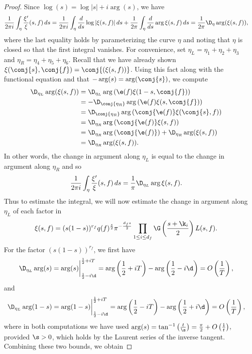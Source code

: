 \begin{proof}
      Since $\log(s) = \log|s|+i\arg(s)$, we have
      \[
        \frac{1}{2\pi i}\int_{\eta}\frac{\xi'}{\xi}(s,f)\,ds = \frac{1}{2\pi i}\int_{\eta}\frac{d}{ds}\log|\xi(s,f)|\,ds+\frac{1}{2\pi }\int_{\eta}\frac{d}{ds}\arg\xi(s,f)\,ds = \frac{1}{2\pi}\D_{\eta}\arg(\xi(s,f)),
      \]
      where the last equality holds by parameterizing the curve $\eta$ and noting that $\eta$ is closed so that the first integral vanishes. For convenience, set $\eta_{L} = \eta_{1}+\eta_{2}+\eta_{3}$ and $\eta_{R} = \eta_{4}+\eta_{5}+\eta_{6}$. Recall that we have already shown $\xi(\conj{s},\conj{f}) = \conj{(\xi(s,f))}$. Using this fact along with the functional equation and that $-\arg(s) = \arg(\conj{s})$, we compute
      \begin{align*}
        \D_{\eta_{L}}\arg(\xi(s,f)) &= \D_{\eta_{L}}\arg\left(\e(f)\xi(1-s,\conj{f})\right) \\
        &= -\D_{\conj{\eta_{R}}}\arg\left(\e(f)\xi(s,\conj{f})\right) \\
        &= \D_{\conj{\eta_{R}}}\arg\left(\conj{\e(f)}\xi(\conj{s},f)\right) \\
        &= \D_{\eta_{R}}\arg\left(\conj{\e(f)}\xi(s,f)\right) \\
        &= \D_{\eta_{R}}\arg\left(\conj{\e(f)}\right)+\D_{\eta_{R}}\arg(\xi(s,f)) \\
        &= \D_{\eta_{R}}\arg(\xi(s,f)).
      \end{align*}
      In other words, the change in argument along $\eta_{L}$ is equal to the change in argument along $\eta_{R}$ and so
      \[
        \frac{1}{2\pi i}\int_{\eta}\frac{\xi'}{\xi}(s,f)\,ds = \frac{1}{\pi}\D_{\eta_{L}}\arg\xi(s,f).
      \]
      Thus to estimate the integral, we will now estimate the change in argument along $\eta_{L}$ of each factor in
      \[
        \xi(s,f) = (s(1-s))^{r_{f}}q(f)^{\frac{s}{2}}\pi^{-\frac{d_{f}s}{2}}\prod_{1 \le i \le d_{f}}\G\left(\frac{s+\k_{i}}{2}\right)L(s,f).
      \]
      For the factor $(s(1-s))^{r_{f}}$, we first have
      \[
        \D_{\eta_{L}}\arg(s) = \arg(s)\bigg|_{\frac{1}{2}-i\d}^{\frac{1}{2}+iT} = \arg\left(\frac{1}{2}+iT\right)-\arg\left(\frac{1}{2}-i\d\right) = O\left(\frac{1}{T}\right),
      \]
      and
      \[
        \D_{\eta_{L}}\arg(1-s) = \arg(1-s)\bigg|_{\frac{1}{2}-i\d}^{\frac{1}{2}+iT} = \arg\left(\frac{1}{2}-iT\right)-\arg\left(\frac{1}{2}+i\d\right) = O\left(\frac{1}{T}\right),
      \]
      where in both computations we have used $\arg(s) = \tan^{-1}\left(\frac{t}{\s}\right) = \frac{\pi}{2}+O\left(\frac{1}{t}\right)$, provided $\s > 0$, which holds by the Laurent series of the inverse tangent. Combining these two bounds, we obtain

\end{proof}
